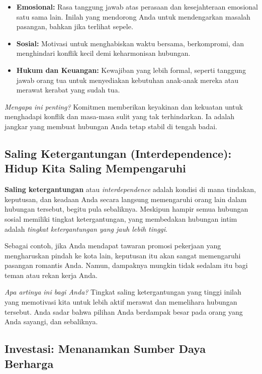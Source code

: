\documentclass[
  letterpaper,
  DIV=11,
  numbers=noendperiod]{scrreprt}
\providecommand{\tightlist}{%
  \setlength{\itemsep}{0pt}\setlength{\parskip}{0pt}}
\begin{document}
\begin{itemize}
\tightlist
\item
  \textbf{Emosional:} Rasa tanggung jawab atas perasaan dan
  kesejahteraan emosional satu sama lain. Inilah yang mendorong Anda
  untuk mendengarkan masalah pasangan, bahkan jika terlihat sepele.
\item
  \textbf{Sosial:} Motivasi untuk menghabiskan waktu bersama,
  berkompromi, dan menghindari konflik kecil demi keharmonisan hubungan.
\item
  \textbf{Hukum dan Keuangan:} Kewajiban yang lebih formal, seperti
  tanggung jawab orang tua untuk menyediakan kebutuhan anak-anak mereka
  atau merawat kerabat yang sudah tua.
\end{itemize}

\emph{Mengapa ini penting?} Komitmen memberikan keyakinan dan kekuatan
untuk menghadapi konflik dan masa-masa sulit yang tak terhindarkan. Ia
adalah jangkar yang membuat hubungan Anda tetap stabil di tengah badai.

\subsection{Saling Ketergantungan (Interdependence): Hidup Kita Saling
Mempengaruhi}\label{saling-ketergantungan-interdependence-hidup-kita-saling-mempengaruhi}

\textbf{Saling ketergantungan} atau \emph{interdependence} adalah
kondisi di mana tindakan, keputusan, dan keadaan Anda secara langsung
memengaruhi orang lain dalam hubungan tersebut, begitu pula sebaliknya.
Meskipun hampir semua hubungan sosial memiliki tingkat ketergantungan,
yang membedakan hubungan intim adalah \emph{tingkat ketergantungan yang
jauh lebih tinggi}.

Sebagai contoh, jika Anda mendapat tawaran promosi pekerjaan yang
mengharuskan pindah ke kota lain, keputusan itu akan sangat memengaruhi
pasangan romantis Anda. Namun, dampaknya mungkin tidak sedalam itu bagi
teman atau rekan kerja Anda.

\emph{Apa artinya ini bagi Anda?} Tingkat saling ketergantungan yang
tinggi inilah yang memotivasi kita untuk lebih aktif merawat dan
memelihara hubungan tersebut. Anda sadar bahwa pilihan Anda berdampak
besar pada orang yang Anda sayangi, dan sebaliknya.

\subsection{Investasi: Menanamkan Sumber Daya
Berharga}\label{investasi-menanamkan-sumber-daya-berharga}
\end{document}
